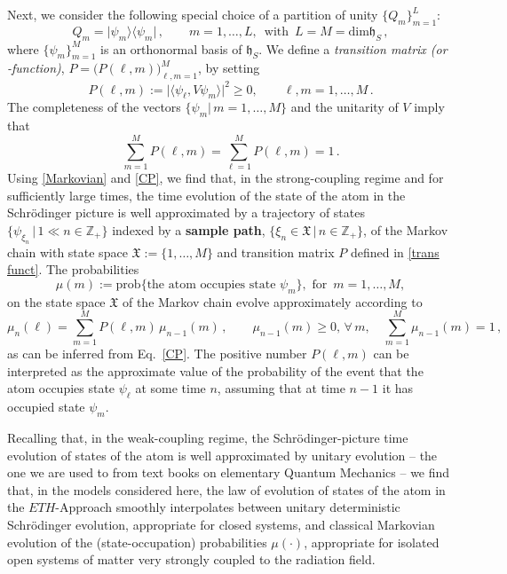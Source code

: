 \documentclass[a4paper,11pt]{article}
\begin{document}
{Next, we consider the following special choice of a partition of unity $\big\{Q_{m}\big\}_{m=1}^{L}$:
\begin{equation}\label{rank 1}
Q_m = \vert \psi_m \rangle \langle \psi_m \vert\,, \qquad m=1,\dots, L, \,\text{ with }\, L=M=\text{dim}\mathfrak{h}_S\,,
\end{equation}
where $\big\{\psi_m\big\}_{m=1}^{M}$ is an orthonormal basis of $\mathfrak{h}_S$. We define a 
\textit{transition matrix (or -function)}, 
$P=\big(P(\ell, m)\big)_{\ell, m=1}^{M}$, by setting
\begin{equation}\label{trans funct}
P(\ell, m):= \vert \langle \psi_\ell, V \psi_m \rangle \vert^{2} \geq 0, \qquad \ell, m = 1,\dots, M\,.
\end{equation}
The completeness of the vectors $\big\{\psi_m \vert \,m=1,\dots, M\big\}$ and the unitarity of $V$ imply that
\begin{equation}\label{proba}
\sum_{m=1}^{M} P(\ell,m) = \sum_{\ell=1}^{M} P(\ell, m) =1\,.
\end{equation}
Using \eqref{Markovian} and \eqref{CP}, we find that, in the strong-coupling regime and for sufficiently large times,  
the time evolution of the state of the atom in the Schr\"odinger picture is well approximated by a trajectory of states 
$\big\{ \psi_{\xi_{n}} \,\vert\, 1\ll n\in \mathbb{Z}_{+}\big\}$ indexed by a {\bf{sample path}}, 
$\big\{\xi_{n} \in \mathfrak{X}\,\vert\, n \in \mathbb{Z}_{+} \big\}$, of the Markov chain with state space 
$\mathfrak{X}:=\big\{1, \dots, M\big\}$ and transition matrix $P$ defined in \eqref{trans funct}. The probabilities
$$\mu(m) := \text{prob}\big\{\text{the atom occupies state } \psi_m\big\}, \text{ for }\,m=1,\dots, M,$$
on the state space $\mathfrak{X}$ of the Markov chain evolve approximately according to 
\begin{equation}\label{Markov chain}
\mu_{n}(\ell)= \sum_{m=1}^{M} P(\ell, m)\, \mu_{n-1}(m)\,, \qquad \mu_{n-1}(m)\geq 0, \, \forall\, m, \quad \sum_{m=1}^{M}\mu_{n-1}(m)=1\,,
\end{equation}
as can be inferred from Eq.~\eqref{CP}. The positive number $P(\ell, m)$ can be interpreted as the approximate value 
of the probability of the event that the atom occupies state $\psi_{\ell}$ at some time $n$, assuming that at time $n-1$ 
it has occupied state $\psi_{m}$.

Recalling that, in the weak-coupling regime, the Schr\"odinger-picture time evolution of states of the 
atom is well approximated by unitary evolution -- the one we are used to from text books on elementary Quantum 
Mechanics -- we find that, in the models considered here, the law of evolution of states of the atom in the $ETH$-Approach 
smoothly interpolates between unitary deterministic Schr\"odinger evolution, appropriate for closed systems, and classical 
Markovian evolution of the (state-occupation) probabilities $\mu(\cdot)$, appropriate for isolated open systems of matter very strongly coupled to the radiation field.\\

}
\end{document}
